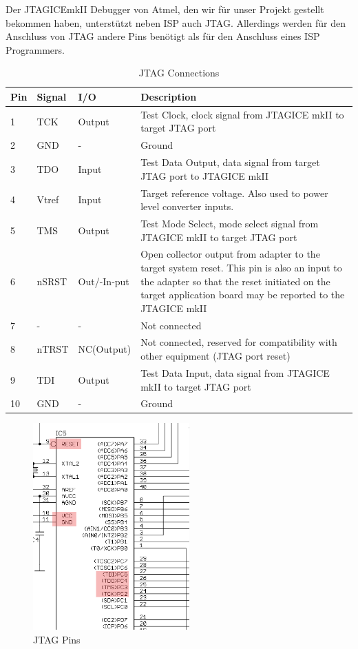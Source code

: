 Der JTAGICEmkII Debugger von Atmel, den wir für unser Projekt gestellt bekommen
haben, unterstützt neben ISP auch JTAG. Allerdings werden für den Anschluss von
JTAG andere Pins benötigt als für den Anschluss eines ISP Programmers.

\begin{table}
\begin{longtable}{|l|l|l|p{8.8cm}|}\hline 
Pin & Signal & I/O & Description \\ \hline 
1 & TCK & Output & Test Clock, clock signal from JTAGICE mkII to target JTAG port \\ \hline 
2 & GND & - & Ground \\ \hline 
3 & TDO & Input & Test Data Output, data signal from target JTAG port to JTAGICE mkII \\ \hline 
4 & Vtref & Input & Target reference voltage. Also used to power level converter inputs. \\ \hline 
5 & TMS & Output & Test Mode Select, mode select signal from JTAGICE mkII to target JTAG port \\ \hline 
6 & nSRST & Out/-In-put & Open collector output from adapter to the target system reset. This pin is also an input to the adapter so that the reset initiated on the target application board may be reported to the JTAGICE mkII \\ \hline 
7 & - & - & Not connected \\ \hline 
8 & nTRST & NC(Output) & Not connected, reserved for compatibility with other equipment (JTAG port reset) \\ \hline 
9 & TDI & Output & Test Data Input, data signal from JTAGICE mkII to target JTAG port \\ \hline 
10 & GND & - & Ground \\ \hline 
\end{longtable}
\caption{JTAG Connections \cite{JTAGICEmkII.Quick}}
\label{jtag.Connections}
\end{table}

\begin{figure}[htp]
\begin{center}
  \includegraphics[width=6cm]{content/pictures/jatgPins.png}
  \caption{JTAG Pins}
  \label{jtag.pins}
\end{center}
\end{figure}


